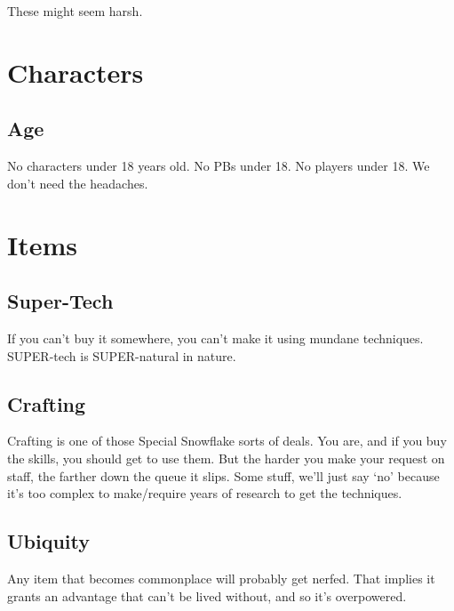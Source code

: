 These might seem harsh. 
\section{Characters}
\subsection{Age}
No characters under 18 years old. No PBs under 18. No players under
18. We don't need the headaches.
\section{Items}
\subsection{Super-Tech}
If you can't buy it somewhere, you can’t make it using mundane
techniques. SUPER-tech is SUPER-natural in nature.
\subsection{Crafting}
Crafting is one of those Special Snowflake sorts of deals. You are, and if
you buy the skills, you should get to use them. But the harder you make
your request on staff, the farther down the queue it slips. Some stuff,
we'll just say `no' because it’s too complex to make/require
years of research to get the techniques.
\subsection{Ubiquity}
Any item that becomes commonplace will probably get nerfed. That implies
it grants an advantage that can't  be lived without, and so it's
overpowered.

